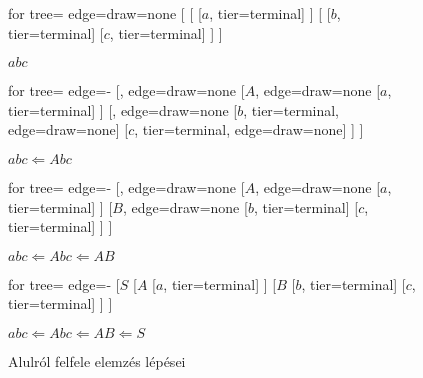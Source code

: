\begin{figure}[h!]
	\centering
	\begin{minipage}{0.2\linewidth}
		\begin{center}
			\begin{forest}
				for tree={ edge={draw=none}}
				[$ $
				[$ $
				[$a$, tier=terminal]
				]
				[$ $
				[$b$, tier=terminal]
				[$c$, tier=terminal]
				]
				]
			\end{forest}
			
			$abc$
		\end{center}
	\end{minipage}
	\begin{minipage}{0.2\linewidth}
		\begin{center}
			\begin{forest}
				for tree={ edge={-}}
				[$ $, edge={draw=none}
				[$A$, edge={draw=none}
				[$a$, tier=terminal]
				]
				[$ $, edge={draw=none}
				[$b$, tier=terminal, edge={draw=none}]
				[$c$, tier=terminal, edge={draw=none}]
				]
				]
			\end{forest}
			
			$abc \Leftarrow Abc$
		\end{center}
	\end{minipage}
	\begin{minipage}{0.2\linewidth}
		\begin{center}
			\begin{forest}
				for tree={ edge={-}}
				[$ $, edge={draw=none}
				[$A$, edge={draw=none}
				[$a$, tier=terminal]
				]
				[$B$, edge={draw=none}
				[$b$, tier=terminal]
				[$c$, tier=terminal]
				]
				]
			\end{forest}
			
			$abc \Leftarrow Abc \Leftarrow AB$
		\end{center}
	\end{minipage}
	\begin{minipage}{0.30\linewidth}
		\begin{center}
			\begin{forest}
				for tree={ edge={-}}
				[$S$
				[$A$
				[$a$, tier=terminal]
				]
				[$B$
				[$b$, tier=terminal]
				[$c$, tier=terminal]
				]
				]
			\end{forest}
			
			$abc \Leftarrow Abc \Leftarrow AB \Leftarrow S$
		\end{center}
	\end{minipage}
	\caption{Alulról felfele elemzés lépései}
\end{figure}

